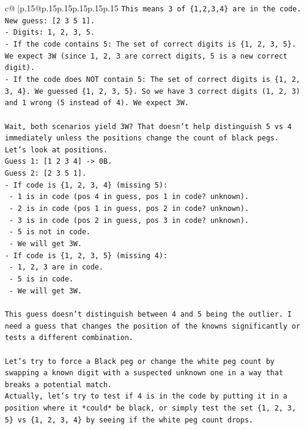 \documentclass{article}
\begin{document}
{\begin{supertabular}{c@{$\;$}|p{.15\linewidth}@{}p{.15\linewidth}p{.15\linewidth}p{.15\linewidth}p{.15\linewidth}p{.15\linewidth}}
{{{\texttt{This means 3 of \{1,2,3,4\} are in the code.} \\
\texttt{New guess: {[}2 3 5 1{]}.} \\
\texttt{{-} Digits: 1, 2, 3, 5.} \\
\texttt{{-} If the code contains 5: The set of correct digits is \{1, 2, 3, 5\}. We expect 3W (since 1, 2, 3 are correct digits, 5 is a new correct digit).} \\
\texttt{{-} If the code does NOT contain 5: The set of correct digits is \{1, 2, 3, 4\}. We guessed \{1, 2, 3, 5\}. So we have 3 correct digits (1, 2, 3) and 1 wrong (5 instead of 4). We expect 3W.} \\
\\ 
\texttt{Wait, both scenarios yield 3W? That doesn't help distinguish 5 vs 4 immediately unless the positions change the count of black pegs.} \\
\texttt{Let's look at positions.} \\
\texttt{Guess 1: {[}1 2 3 4{]} {-}> 0B.} \\
\texttt{Guess 2: {[}2 3 5 1{]}.} \\
\texttt{{-} If code is \{1, 2, 3, 4\} (missing 5):} \\
\texttt{  {-} 1 is in code (pos 4 in guess, pos 1 in code? unknown).} \\
\texttt{  {-} 2 is in code (pos 1 in guess, pos 2 in code? unknown).} \\
\texttt{  {-} 3 is in code (pos 2 in guess, pos 3 in code? unknown).} \\
\texttt{  {-} 5 is not in code.} \\
\texttt{  {-} We will get 3W.} \\
\texttt{{-} If code is \{1, 2, 3, 5\} (missing 4):} \\
\texttt{  {-} 1, 2, 3 are in code.} \\
\texttt{  {-} 5 is in code.} \\
\texttt{  {-} We will get 3W.} \\
\\ 
\texttt{This guess doesn't distinguish between 4 and 5 being the outlier. I need a guess that changes the position of the knowns significantly or tests a different combination.} \\
\\ 
\texttt{Let's try to force a Black peg or change the white peg count by swapping a known digit with a suspected unknown one in a way that breaks a potential match.} \\
\texttt{Actually, let's try to test if 4 is in the code by putting it in a position where it *could* be black, or simply test the set \{1, 2, 3, 5\} vs \{1, 2, 3, 4\} by seeing if the white peg count drops.} \\
}}}
\end{supertabular}}
\end{document}
